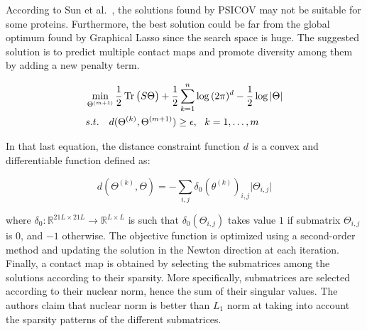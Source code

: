         According to Sun et al.~\cite{sun2015predicting}, the solutions found by PSICOV may not be suitable for some proteins.
        Furthermore, the best solution could be far from the global optimum found by Graphical Lasso since the search space is huge.
        The suggested solution is to predict multiple contact maps and promote diversity among them by adding a new penalty term.

        \begin{equation}\label{mbest}
            \begin{split}
                & \min_{\Theta^{(m+1)}} \frac{1}{2} \operatorname{Tr}\big(S \Theta\big) + \frac{1}{2}
                    \sum\limits_{k=1}^{n} \log{(2\pi)^d} - \frac{1}{2} \log{\vert\Theta\vert} \\
                & s.t. \ \ \ d(\Theta^{(k)}, \Theta^{(m+1)}) \ge \epsilon, \ \ k = 1, \dotsc, m
            \end{split}
        \end{equation}

        In that last equation, the distance constraint function $d$ is a convex and differentiable function defined as:

        \begin{equation}
            d(\Theta^{(k)}, \Theta) = - \sum\limits_{i, j} \delta_0(\theta^{(k)})_{i, j} \vert \Theta_{i, j} \vert
        \end{equation}

        where $\delta_0: \mathbb{R}^{21L \times 21L} \rightarrow \mathbb{R}^{L \times L}$ is such that
        $\delta_0(\Theta_{i, j})$ takes value $1$ if submatrix $\Theta_{i, j}$ is $0$, and $-1$ otherwise.
        The objective function is optimized using a second-order method and updating the solution in the Newton direction at each iteration.
        Finally, a contact map is obtained by selecting the submatrices among the solutions according to their sparsity.
        More specifically, submatrices are selected according to their nuclear norm, hence the sum of their singular values.
        The authors claim that nuclear norm is better than $L_1$ norm at taking into account the sparsity patterns of the
        different submatrices.
